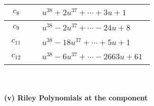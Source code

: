 \documentclass[1p]{elsarticle_modified}
\theoremstyle{definition}
\begin{document}
\begin{tabular}{m{50pt}|m{274pt}}
\hline $$\begin{aligned}c_{8}\end{aligned}$$&$\begin{aligned}
&u^{38}+2 u^{37}+\cdots+3 u+1
\end{aligned}$\\
\hline $$\begin{aligned}c_{9}\end{aligned}$$&$\begin{aligned}
&u^{38}-2 u^{37}+\cdots-24 u+8
\end{aligned}$\\
\hline $$\begin{aligned}c_{11}\end{aligned}$$&$\begin{aligned}
&u^{38}-18 u^{37}+\cdots+5 u+1
\end{aligned}$\\
\hline $$\begin{aligned}c_{12}\end{aligned}$$&$\begin{aligned}
&u^{38}-6 u^{37}+\cdots-2663 u+61
\end{aligned}$\\
\hline
\end{tabular}\\~\\
\newpage\renewcommand{\arraystretch}{1}
\flushleft \textbf{(v) Riley Polynomials at the component}\newline \\
\end{document}
